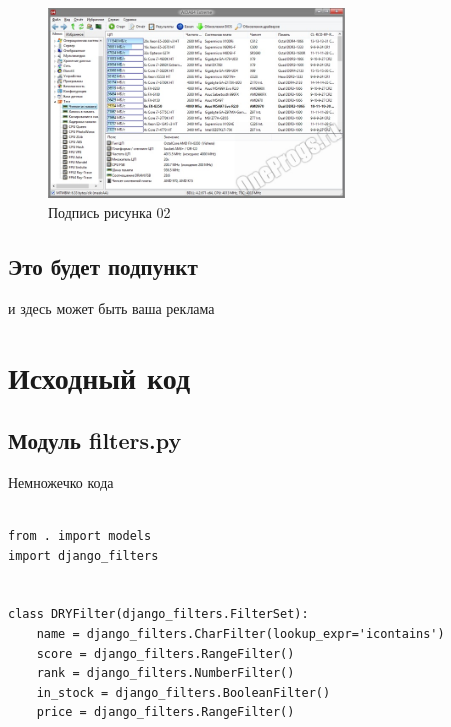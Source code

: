 \documentclass[oneside,final,12pt]{extreport}
\begin{document}
\begin{figure}[hp]
	\centering
	\includegraphics[width=0.7\textwidth]{images/002-AIDA64_scr}
	\caption{Подпись рисунка 02}
	\label{img:01:002-AIDA64_scr}
\end{figure}
\section{Это будет подпункт}
и здесь может быть ваша реклама
\appendix
\chapter{Исходный код}
\section{Модуль filters.py}
Немножечко кода

\begin{verbatim}

from . import models
import django_filters


class DRYFilter(django_filters.FilterSet):
    name = django_filters.CharFilter(lookup_expr='icontains')
    score = django_filters.RangeFilter()
    rank = django_filters.NumberFilter()
    in_stock = django_filters.BooleanFilter()
    price = django_filters.RangeFilter()

\end{verbatim}
\end{document}

